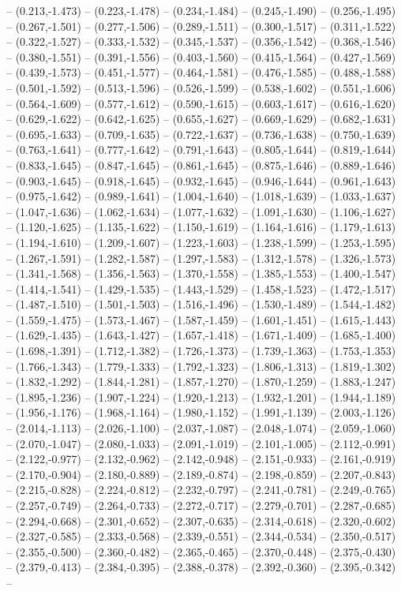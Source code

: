 -- (0.213,-1.473) -- (0.223,-1.478) -- (0.234,-1.484) -- (0.245,-1.490) -- (0.256,-1.495) -- (0.267,-1.501) -- (0.277,-1.506) -- (0.289,-1.511) -- (0.300,-1.517) -- (0.311,-1.522) -- (0.322,-1.527) -- (0.333,-1.532) -- (0.345,-1.537) -- (0.356,-1.542) -- (0.368,-1.546) -- (0.380,-1.551) -- (0.391,-1.556) -- (0.403,-1.560) -- (0.415,-1.564) -- (0.427,-1.569) -- (0.439,-1.573) -- (0.451,-1.577) -- (0.464,-1.581) -- (0.476,-1.585) -- (0.488,-1.588) -- (0.501,-1.592) -- (0.513,-1.596) -- (0.526,-1.599) -- (0.538,-1.602) -- (0.551,-1.606) -- (0.564,-1.609) -- (0.577,-1.612) -- (0.590,-1.615) -- (0.603,-1.617) -- (0.616,-1.620) -- (0.629,-1.622) -- (0.642,-1.625) -- (0.655,-1.627) -- (0.669,-1.629) -- (0.682,-1.631) -- (0.695,-1.633) -- (0.709,-1.635) -- (0.722,-1.637) -- (0.736,-1.638) -- (0.750,-1.639) -- (0.763,-1.641) -- (0.777,-1.642) -- (0.791,-1.643) -- (0.805,-1.644) -- (0.819,-1.644) -- (0.833,-1.645) -- (0.847,-1.645) -- (0.861,-1.645) -- (0.875,-1.646) -- (0.889,-1.646) -- (0.903,-1.645) -- (0.918,-1.645) -- (0.932,-1.645) -- (0.946,-1.644) -- (0.961,-1.643) -- (0.975,-1.642) -- (0.989,-1.641) -- (1.004,-1.640) -- (1.018,-1.639) -- (1.033,-1.637) -- (1.047,-1.636) -- (1.062,-1.634) -- (1.077,-1.632) -- (1.091,-1.630) -- (1.106,-1.627) -- (1.120,-1.625) -- (1.135,-1.622) -- (1.150,-1.619) -- (1.164,-1.616) -- (1.179,-1.613) -- (1.194,-1.610) -- (1.209,-1.607) -- (1.223,-1.603) -- (1.238,-1.599) -- (1.253,-1.595) -- (1.267,-1.591) -- (1.282,-1.587) -- (1.297,-1.583) -- (1.312,-1.578) -- (1.326,-1.573) -- (1.341,-1.568) -- (1.356,-1.563) -- (1.370,-1.558) -- (1.385,-1.553) -- (1.400,-1.547) -- (1.414,-1.541) -- (1.429,-1.535) -- (1.443,-1.529) -- (1.458,-1.523) -- (1.472,-1.517) -- (1.487,-1.510) -- (1.501,-1.503) -- (1.516,-1.496) -- (1.530,-1.489) -- (1.544,-1.482) -- (1.559,-1.475) -- (1.573,-1.467) -- (1.587,-1.459) -- (1.601,-1.451) -- (1.615,-1.443) -- (1.629,-1.435) -- (1.643,-1.427) -- (1.657,-1.418) -- (1.671,-1.409) -- (1.685,-1.400) -- (1.698,-1.391) -- (1.712,-1.382) -- (1.726,-1.373) -- (1.739,-1.363) -- (1.753,-1.353) -- (1.766,-1.343) -- (1.779,-1.333) -- (1.792,-1.323) -- (1.806,-1.313) -- (1.819,-1.302) -- (1.832,-1.292) -- (1.844,-1.281) -- (1.857,-1.270) -- (1.870,-1.259) -- (1.883,-1.247) -- (1.895,-1.236) -- (1.907,-1.224) -- (1.920,-1.213) -- (1.932,-1.201) -- (1.944,-1.189) -- (1.956,-1.176) -- (1.968,-1.164) -- (1.980,-1.152) -- (1.991,-1.139) -- (2.003,-1.126) -- (2.014,-1.113) -- (2.026,-1.100) -- (2.037,-1.087) -- (2.048,-1.074) -- (2.059,-1.060) -- (2.070,-1.047) -- (2.080,-1.033) -- (2.091,-1.019) -- (2.101,-1.005) -- (2.112,-0.991) -- (2.122,-0.977) -- (2.132,-0.962) -- (2.142,-0.948) -- (2.151,-0.933) -- (2.161,-0.919) -- (2.170,-0.904) -- (2.180,-0.889) -- (2.189,-0.874) -- (2.198,-0.859) -- (2.207,-0.843) -- (2.215,-0.828) -- (2.224,-0.812) -- (2.232,-0.797) -- (2.241,-0.781) -- (2.249,-0.765) -- (2.257,-0.749) -- (2.264,-0.733) -- (2.272,-0.717) -- (2.279,-0.701) -- (2.287,-0.685) -- (2.294,-0.668) -- (2.301,-0.652) -- (2.307,-0.635) -- (2.314,-0.618) -- (2.320,-0.602) -- (2.327,-0.585) -- (2.333,-0.568) -- (2.339,-0.551) -- (2.344,-0.534) -- (2.350,-0.517) -- (2.355,-0.500) -- (2.360,-0.482) -- (2.365,-0.465) -- (2.370,-0.448) -- (2.375,-0.430) -- (2.379,-0.413) -- (2.384,-0.395) -- (2.388,-0.378) -- (2.392,-0.360) -- (2.395,-0.342) -- 